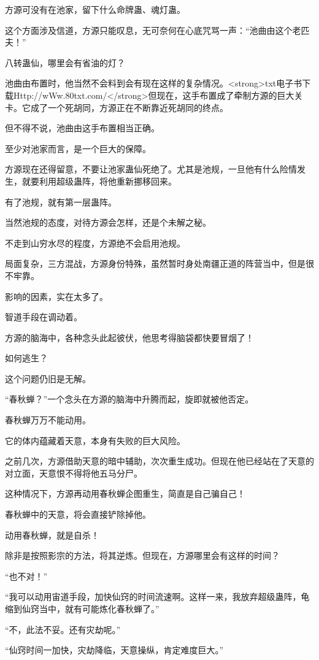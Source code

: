 \begin{this_body}
方源可没有在池家，留下什么命牌蛊、魂灯蛊。

这个方面涉及信道，方源只能叹息，无可奈何在心底咒骂一声：“池曲由这个老匹夫！”

八转蛊仙，哪里会有省油的灯？

池曲由布置时，他当然不会料到会有现在这样的复杂情况。<strong>txt电子书下载Http://wWw.80txt.com/</strong>但现在，这手布置成了牵制方源的巨大关卡。它成了一个死胡同，方源正在不断靠近死胡同的终点。

但不得不说，池曲由这手布置相当正确。

至少对池家而言，是一个巨大的保障。

方源现在还得留意，不要让池家蛊仙死绝了。尤其是池规，一旦他有什么险情发生，就要利用超级蛊阵，将他重新挪移回来。

有了池规，就有第一层蛊阵。

当然池规的态度，对待方源会怎样，还是个未解之秘。

不走到山穷水尽的程度，方源绝不会启用池规。

局面复杂，三方混战，方源身份特殊，虽然暂时身处南疆正道的阵营当中，但是很不牢靠。

影响的因素，实在太多了。

智道手段在调动着。

方源的脑海中，各种念头此起彼伏，他思考得脑袋都快要冒烟了！

如何逃生？

这个问题仍旧是无解。

“春秋蝉？”一个念头在方源的脑海中升腾而起，旋即就被他否定。

春秋蝉万万不能动用。

它的体内蕴藏着天意，本身有失败的巨大风险。

之前几次，方源借助天意的暗中辅助，次次重生成功。但现在他已经站在了天意的对立面，天意恨不得将他五马分尸。

这种情况下，方源再动用春秋蝉企图重生，简直是自己骗自己！

春秋蝉中的天意，将会直接铲除掉他。

动用春秋蝉，就是自杀！

除非是按照影宗的方法，将其逆炼。但现在，方源哪里会有这样的时间？

“也不对！”

“我可以动用宙道手段，加快仙窍的时间流速啊。这样一来，我放弃超级蛊阵，龟缩到仙窍当中，就有可能炼化春秋蝉了。”

“不，此法不妥。还有灾劫呢。”

“仙窍时间一加快，灾劫降临，天意操纵，肯定难度巨大。”


\end{this_body}
